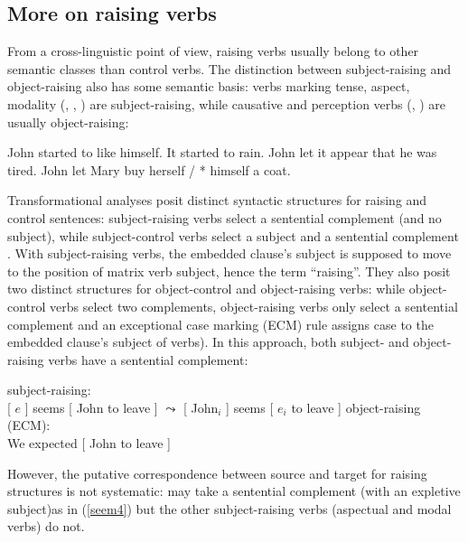 \subsection{More on raising verbs}
\label{sec-more-on-raising-verbs}

From a cross-linguistic point of view, raising verbs usually belong to other semantic classes than
control verbs. The distinction between subject-raising and object-raising also has some semantic
basis: verbs marking tense, aspect, modality (, , ) are
subject-raising, while causative and perception verbs (, ) are usually
object-raising:

\eal
\ex John started to like himself.
\ex It started to rain.
\ex John let it appear that he was tired.
\ex John let Mary buy herself / * himself a coat.
\zl
	

Transformational analyses posit distinct syntactic structures for raising and control sentences:
subject-raising verbs select a sentential complement (and no subject), while subject-control verbs
select a subject and a sentential complement \citep{Postal1974, Chomsky81a}. With subject-raising
verbs, the embedded clause's subject is supposed to move to the position of matrix verb subject,
hence the  term ``raising''. They also posit two distinct structures for object-control and
object-raising verbs: while object-control verbs select two complements, object-raising verbs only
select a sentential complement and an exceptional case marking (ECM) rule assigns case to the
embedded clause's subject of  verbs).
In this approach, both subject- and object-raising verbs have a sentential complement:
	
\eal
\ex subject-raising:\\
{}[ $e$ ] seems [ John to leave ] 
$\leadsto$  
{}[ John$_{i}$ ] seems [ $e_{i}$ to leave ]	
\ex object-raising (ECM):\\
We expected [ John to leave ] 	
\zl

However, the putative correspondence between source and target for raising structures is not
systematic:  may take a sentential complement (with an expletive subject)as in
(\ref{seem4}) but the other subject-raising verbs (aspectual and modal verbs) do not.

